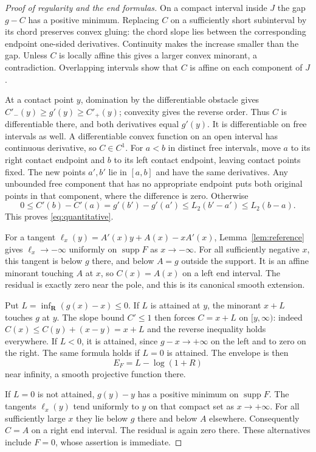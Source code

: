\documentclass[11pt]{article}
\theoremstyle{remark}\newtheorem{remark}[theorem]{Remark}
\begin{document}
\begin{proof}[Proof of regularity and the end formulas]
On a compact interval inside $J$ the gap $g-C$ has a positive minimum.
Replacing $C$ on a sufficiently short subinterval by its chord preserves
convex gluing: the chord slope lies between the corresponding endpoint
one-sided derivatives. Continuity makes the increase smaller than the
gap. Unless $C$ is locally affine this gives a larger convex minorant,
a contradiction. Overlapping intervals show that $C$ is affine on
each component of $J$.

At a contact point $y$, domination by the differentiable obstacle gives
$C'_-(y)\geq g'(y)\geq C'_+(y)$; convexity gives the reverse order.
Thus $C$ is differentiable there, and both derivatives equal $g'(y)$.
It is differentiable on free intervals as well. A differentiable convex
function on an open interval has continuous derivative, so $C\in C^1$.
For $a<b$ in distinct free intervals, move $a$ to its right contact
endpoint and $b$ to its left contact endpoint, leaving contact points
fixed. The new points $a',b'$ lie in $[a,b]$ and have the same
derivatives. Any unbounded free component that has no appropriate
endpoint puts both original points in that component, where the
difference is zero. Otherwise
\[
 0\leq C'(b)-C'(a)=g'(b')-g'(a')
       \leq L_2(b'-a')\leq L_2(b-a).
\]
This proves \eqref{eq:quantitative}.

For a tangent $\ell_x(y)=A'(x)y+A(x)-xA'(x)$, Lemma~\ref{lem:reference}
gives $\ell_x\to-\infty$ uniformly on $\operatorname{supp}F$ as
$x\to-\infty$. For all sufficiently negative $x$, this tangent is
below $g$ there, and below $A=g$ outside the support. It is an affine
minorant touching $A$ at $x$, so $C(x)=A(x)$ on a left end interval.
The residual is exactly zero near the pole, and this is its canonical
smooth extension.

Put $L=\inf_{\mathbf R}(g(x)-x)\leq0$. If $L$ is attained at $y$,
the minorant $x+L$ touches $g$ at $y$. The slope bound $C'\leq1$
then forces $C=x+L$ on $[y,\infty)$: indeed
$C(x)\leq C(y)+(x-y)=x+L$ and the reverse inequality holds everywhere.
If $L<0$, it is attained, since $g-x\to+\infty$ on the left and
to zero on the right. The same formula holds if $L=0$ is attained.
The envelope is then
\begin{equation}\label{eq:tail}
 E_F=L-\log(1+R)
\end{equation}
near infinity, a smooth projective function there.

If $L=0$ is not attained, $g(y)-y$ has a positive minimum on
$\operatorname{supp}F$. The tangents $\ell_x(y)$ tend uniformly to
$y$ on that compact set as $x\to+\infty$. For all sufficiently large
$x$ they lie below $g$ there and below $A$ elsewhere. Consequently
$C=A$ on a right end interval. The residual is again zero there.
These alternatives include $F=0$, whose assertion is immediate.


\end{proof}
\end{document}
